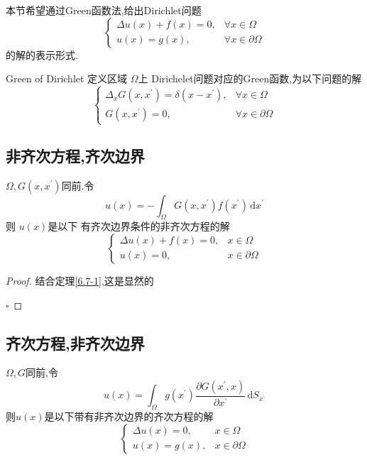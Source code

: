 \documentclass[../../main.tex]{subfiles}
\begin{document}
本节希望通过Green函数法,给出Dirichlet问题 \[
\begin{cases}  \Delta u\left( x \right)+ f\left( x \right)= 0,& \forall x\in  \Omega \\ 
 u\left( x \right)= g\left( x \right),&\forall x\in  \partial  \Omega      \end{cases} 
\]的解的表示形式.

\begin{definition}{Green of Dirichlet}
    定义区域 \(   \Omega   \)上 Dirichelet问题对应的Green函数,为以下问题的解 \[
    \begin{cases}  \Delta _{x}G\left( x,x^{\prime}  \right)=  \delta \left( x-x^{\prime}  \right),&\forall x\in  \Omega \\ 
     G\left( x,x^{\prime}  \right)= 0,&\forall x\in  \partial  \Omega     \end{cases} 
    \]
\end{definition}


\subsection{非齐次方程,齐次边界}


\begin{theorem}
    \(   \Omega   ,G\left( x,x^{\prime}  \right) \)同前.令 \[
    u\left( x \right)= -\int_{ \Omega }G\left( x,x^{\prime}  \right)f\left( x^{\prime}  \right)\,\mathrm{d} x^{\prime}    
    \]则 \(  u\left( x \right)   \)是以下 有齐次边界条件的非齐次方程的解 \[
    \begin{cases}  \Delta u\left( x \right)+ f\left( x \right)= 0,&x\in  \Omega \\ 
     u\left( x \right)  = 0,&x\in  \partial  \Omega   \end{cases} 
    \]  
\end{theorem}

\begin{proof}
    结合定理\ref{6.7-1},这是显然的

    \hfill $\square$
\end{proof}

\subsection{齐次方程,非齐次边界}

\begin{theorem}
    \(   \Omega ,G  \)同前,令 \[
    u\left( x \right)= \int_{ \Omega }g\left( x^{\prime}  \right) \frac{\partial G\left( x^{\prime} ,x \right) }{\partial x^{\prime} }\,\mathrm{d} S_{x^{\prime} }  
    \]则\(  u\left( x \right)   \)是以下带有非齐次边界的齐次方程的解 \[
    \begin{cases}  \Delta u\left( x \right)= 0,&x\in  \Omega \\ 
     u\left( x \right)= g\left( x \right),&x\in  \partial  \Omega     \end{cases} 
    \]  
\end{theorem}
\end{document}
